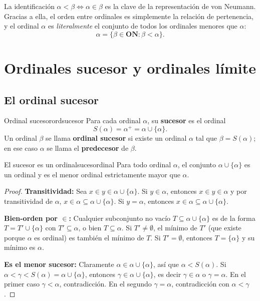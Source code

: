 \begin{importante}
La identificación $\alpha < \beta \iff \alpha \in \beta$ es la clave de la representación de von Neumann. Gracias a ella, el orden entre ordinales es simplemente la relación de pertenencia, y el ordinal $\alpha$ es \emph{literalmente} el conjunto de todos los ordinales menores que $\alpha$:
\[
  \alpha = \{\beta \in \mathbf{ON} : \beta < \alpha\}.
\]
\end{importante}

\section{Ordinales sucesor y ordinales límite}

\subsection{El ordinal sucesor}

\begin{definicion}{Ordinal sucesor}{ordsucesor}
Para cada ordinal $\alpha$, su \textbf{sucesor} es el ordinal
\[
  S(\alpha) = \alpha^{+} = \alpha \cup \{\alpha\}.
\]
Un ordinal $\beta$ se llama \textbf{ordinal sucesor} si existe un ordinal $\alpha$ tal que $\beta = S(\alpha)$; en ese caso $\alpha$ se llama el \textbf{predecesor} de $\beta$.
\end{definicion}

\begin{proposicion}{El sucesor es un ordinal}{sucesordinal}
Para todo ordinal $\alpha$, el conjunto $\alpha \cup \{\alpha\}$ es un ordinal y es el menor ordinal estrictamente mayor que $\alpha$.
\end{proposicion}

\begin{proof}
\textbf{Transitividad:} Sea $x \in y \in \alpha \cup \{\alpha\}$. Si $y \in \alpha$, entonces $x \in y \in \alpha$ y por transitividad de $\alpha$, $x \in \alpha \subseteq \alpha \cup \{\alpha\}$. Si $y = \alpha$, entonces $x \in \alpha \subseteq \alpha \cup \{\alpha\}$.

\textbf{Bien-orden por $\in$:} Cualquier subconjunto no vacío $T \subseteq \alpha \cup \{\alpha\}$ es de la forma $T = T' \cup \{\alpha\}$ con $T' \subseteq \alpha$, o bien $T \subseteq \alpha$. Si $T' \neq \emptyset$, el mínimo de $T'$ (que existe porque $\alpha$ es ordinal) es también el mínimo de $T$. Si $T' = \emptyset$, entonces $T = \{\alpha\}$ y su mínimo es $\alpha$.

\textbf{Es el menor sucesor:} Claramente $\alpha \in \alpha \cup \{\alpha\}$, así que $\alpha < S(\alpha)$. Si $\alpha < \gamma < S(\alpha) = \alpha \cup \{\alpha\}$, entonces $\gamma \in \alpha \cup \{\alpha\}$, es decir $\gamma \in \alpha$ o $\gamma = \alpha$. En el primer caso $\gamma < \alpha$, contradicción. En el segundo $\gamma = \alpha$, contradicción con $\alpha < \gamma$.
\end{proof}

